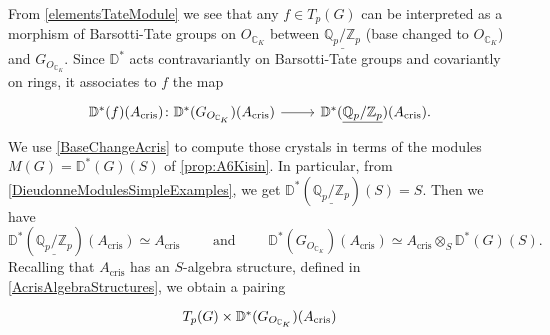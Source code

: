 \begin{rem}[]\label{constr:ComparisonMorphism}
	From \cref{elementsTateModule} we see that any $f \in T_p(G)$
	can be interpreted as a morphism of Barsotti-Tate groups
	on $O_{\mathbb{C}_K}$ between $\underline{\mathbb{Q}_p/\mathbb{Z}_{p}}$
	(base changed to $O_{\mathbb{C}_K}$) and $G_{O_{\mathbb{C}_K}}$.
	Since $\mathbb{D}^*$ acts contravariantly on Barsotti-Tate groups
	and covariantly on rings, it associates to \(f\) the map
	\begin{equation*}
	\begin{tikzcd}[row sep = 0ex
		,/tikz/column 1/.append style={anchor=base east}
		,/tikz/column 2/.append style={anchor=base west}]
		\mathbb{D}^*(f)(A_{\mathrm{cris}})\colon 
		\mathbb{D}^*(G_{O_{\mathbb{C}_K}})(A_{\mathrm{cris}})
		\arrow[r, "", rightarrow] &
		\mathbb{D}^*(\underline{\mathbb{Q}_p/\mathbb{Z}_{p}})(A_{\mathrm{cris}})
	.\end{tikzcd}
	\end{equation*} 
	We use \cref{BaseChangeAcris} to compute those crystals
	in terms of the modules $M(G) = \mathbb{D}^*(G)(S)$ of \cref{prop:A6Kisin}.
	In particular, from \cref{DieudonneModulesSimpleExamples}, we get
	$\mathbb{D}^*(\underline{\mathbb{Q}_p/\mathbb{Z}_{p}})(S) = S$.
	Then we have
	\begin{equation*}
	\mathbb{D}^*(\underline{\mathbb{Q}_p/\mathbb{Z}_{p}})(A_{\mathrm{cris}})
	\simeq A_{\mathrm{cris}}
	\qquad \text{ and } \qquad
	\mathbb{D}^*(G_{O_{\mathbb{C}_K}})(A_{\mathrm{cris}}) \simeq
	A_{\mathrm{cris}} \otimes_S \mathbb{D}^*(G)(S)
	.\end{equation*}
	Recalling that $A_{\mathrm{cris}}$ has an $S$-algebra structure,
	defined in \cref{AcrisAlgebraStructures}, we obtain a pairing
	\begin{equation*}
	\begin{tikzcd}[row sep = 0ex
		,/tikz/column 1/.append style={anchor=base east}
		,/tikz/column 2/.append style={anchor=base west}]
		T_p(G) \times \mathbb{D}^*(G_{O_{\mathbb{C}_K}})(A_{\mathrm{cris}}) 

\end{tikzcd}
\end{equation*}
\end{rem}
